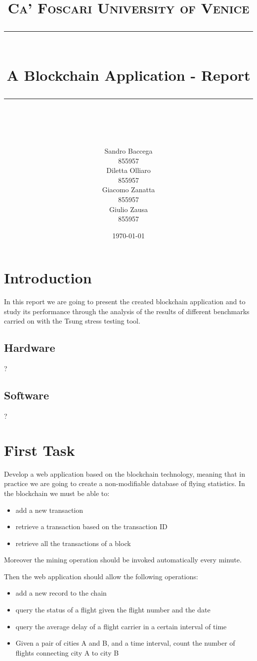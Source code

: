 \documentclass[11pt]{scrartcl} %
\title{	
	\normalfont\normalsize
	\textsc{Ca' Foscari University of Venice}\\ %
	\vspace{25pt} %
	\rule{\linewidth}{0.5pt}\\ %
	\vspace{20pt} %
	{\huge A Blockchain Application - Report}\\ %
	\vspace{12pt} %
	\rule{\linewidth}{2pt}\\ %
	\vspace{12pt} %
}
\author{\hspace{-0.8cm} \parbox{4cm}{\centering
  Sandro Baccega\\ 855957} \parbox{4cm}{\centering
  Diletta Olliaro\\ 855957} \parbox{4cm}{\centering
  Giacomo Zanatta\\ 855957} \parbox{4cm}{\centering Giulio Zausa\\ 855957} } %
\date{\vspace{20pt}\today} %
\begin{document}
\maketitle %

\section{Introduction}

In this report we are going to present the created blockchain application and to study its performance through the analysis of the results of different benchmarks carried on with the Tsung stress testing tool.

\subsection{Hardware}
?
\subsection{Software}
?

\section{First Task}

Develop a web application based on the blockchain technology, meaning that in practice we are going to create a non-modifiable database of flying statistics. In the blockchain we must be able to:
\begin{itemize}
\item[\adforn{43}] add a new transaction
\item[\adforn{43}] retrieve a transaction based on the transaction ID
\item[\adforn{43}] retrieve all the transactions of a block
\end{itemize}

Moreover the mining operation should be invoked automatically every minute. 

Then the web application should allow the following operations:
\begin{itemize}
\item[\adforn{43}] add a new record to the chain
\item[\adforn{43}] query the status of a flight given the flight number and the date
\item[\adforn{43}] query the average delay of a flight carrier in a certain interval of time
\item[\adforn{43}] Given a pair of cities A and B, and a time interval, count the number of flights connecting city A to city B
\end{itemize}
\end{document}

